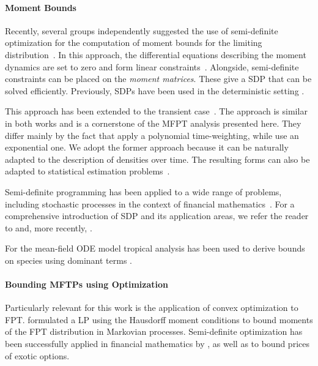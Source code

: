 \paragraph{Moment Bounds} Recently, several groups independently
suggested the use of semi-definite
optimization for the computation of moment bounds for the limiting
distribution~\parencite{ghusinga2017exact,dowdy2018bounds,kuntz2017rigorous,sakurai2017convex}.
In this approach, the differential equations describing the moment dynamics are
set to zero and form linear
constraints~\parencite{backenkohler2018moment}. Alongside,
semi-definite constraints can
be placed on the \emph{moment matrices}. These give a \acf{SDP}
that can be solved efficiently.
Previously, \acp{SDP} have been used in the deterministic setting
\parencite{hasenauer2009guaranteed}.

This approach has been extended to the transient
case~\parencite{dowdy2018dynamic,sakurai2019bounding,holtorf2021tighter}.
The approach is similar in both works and is a cornerstone of the
\ac{MFPT} analysis
presented here.
They differ mainly by the fact that \citet{sakurai2019bounding} apply
a polynomial
time-weighting, while \citet{dowdy2018dynamic} use an
exponential one. We adopt the former approach because it
can be naturally adapted to the description of densities over time.
The resulting forms can also be adapted to statistical estimation
problems~\parencite{backenkohler2019control}.

Semi-definite programming has been applied to a wide range of problems,
including stochastic processes in the context of financial
mathematics~\parencite{lasserre2006pricing,kashima2009polynomial}.
For a comprehensive introduction of \ac{SDP} and its application areas, we refer
the reader to \citet{parrilo2003semidefinite} and, more recently,
\citet{lasserre2010moments}.

For the mean-field \ac{ODE} model tropical analysis has been used to
derive bounds on species using dominant terms \parencite{beica2020tropical}.

\paragraph{Bounding MFTPs using Optimization}
Particularly relevant for this work is the application of convex optimization to
\ac{FPT}\@.
\citet{helmes2001computing} formulated a \ac{LP} using the
Hausdorff moment conditions \parencite{hausdorff} to bound moments of the
\ac{FPT} distribution in Markovian processes.
Semi-definite optimization has been successfully applied in financial
mathematics by \citet{kashima2009polynomial}, as well as
\citet{lasserre2006pricing} to bound prices of exotic options.

